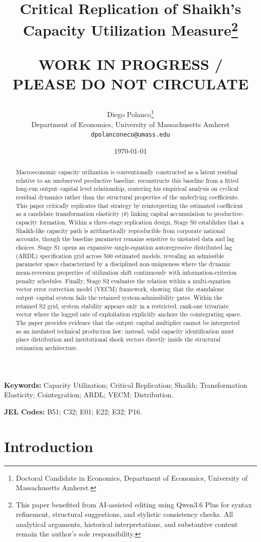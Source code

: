 \documentclass[11pt]{article}
\title{Critical Replication of Shaikh's Capacity Utilization Measure\thanks{This paper benefited from AI-assisted editing using Qwen3.6 Plus for syntax refinement, structural suggestions, and stylistic consistency checks. All analytical arguments, historical interpretations, and substantive content remain the author's sole responsibility.}\\
\begin{large}
\textbf{WORK IN PROGRESS / PLEASE DO NOT CIRCULATE}     
\end{large}
}
\author{Diego Polanco\thanks{Doctoral Candidate in Economics, Department of Economics, University of Massachusetts Amherst.}\\
Department of Economics, University of Massachusetts Amherst\\
\texttt{dpolanconeco@umass.edu}}
\date{\today}
\begin{document}
\maketitle


\begin{abstract}
Macroeconomic capacity utilization is conventionally constructed as a latent residual relative to an unobserved productive baseline. \citet{Shaikh2016} reconstructs this baseline from a fitted long-run output--capital level relationship, centering his empirical analysis on cyclical residual dynamics rather than the structural properties of the underlying coefficients. This paper critically replicates that strategy by reinterpreting the estimated coefficient as a candidate transformation elasticity ($\theta$) linking capital accumulation to productive-capacity formation. Within a three-stage replication design, Stage S0 establishes that a Shaikh-like capacity path is arithmetically reproducible from corporate national accounts, though the baseline parameter remains sensitive to unstated data and lag choices. Stage S1 opens an expansive single-equation autoregressive distributed lag (ARDL) specification grid across 500 estimated models, revealing an admissible parameter space characterized by a disciplined non-uniqueness where the dynamic mean-reversion properties of utilization shift continuously with information-criterion penalty schedules. Finally, Stage S2 evaluates the relation within a multi-equation vector error correction model (VECM) framework, showing that the standalone output--capital system fails the retained system-admissibility gates. Within the retained S2 grid, system stability appears only in a restricted, rank-one trivariate vector where the logged rate of exploitation explicitly anchors the cointegrating space. The paper provides evidence that the output--capital multiplier cannot be interpreted as an insulated technical production law; instead, valid capacity identification must place distribution and institutional shock vectors directly inside the structural estimation architecture.
\end{abstract}


\vspace{1cm}

\noindent\textbf{Keywords:} Capacity Utilization; Critical Replication; Shaikh; Transformation Elasticity; Cointegration; ARDL; VECM; Distribution.

\noindent\textbf{JEL Codes:} B51; C32; E01; E22; E32; P16.

\pagebreak
\section{Introduction}
\label{sec:introduction}
\end{document}
